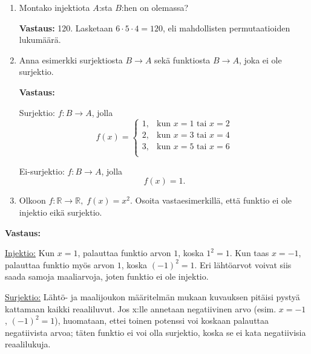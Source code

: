 \documentclass[a4paper,12pt]{article}
\begin{document}
\begin{enumerate}
\begin{enumerate}
\textbf{Vastaus:} 

Injektio: $f: A \rightarrow B$, jolla
\begin{equation*}
    f(x)=2x.
\end{equation*}

Ei-injektio: $f: A \rightarrow B$, jolla
\begin{equation*}
    f(x)=1.
\end{equation*}

\item Montako injektiota $A$:sta $B$:hen on olemassa?

\textbf{Vastaus:} 120. Lasketaan $6\cdot 5 \cdot 4 = 120$, eli mahdollisten permutaatioiden lukumäärä. 

\item Anna esimerkki surjektiosta $B \to A$ sekä funktiosta $B \to A$, joka ei ole surjektio.

\textbf{Vastaus:} 

Surjektio: $f: B \rightarrow A$, jolla
\begin{equation*}
f(x)=
\begin{cases}
    1, & \text{kun } x = 1 \text{ tai } x = 2 \\
    2, & \text{kun } x = 3 \text{ tai } x = 4 \\
    3, & \text{kun } x = 5 \text{ tai } x = 6 \\
\end{cases}
\end{equation*}

Ei-surjektio:  $f: B \rightarrow A$, jolla
\begin{equation*}
    f(x)=1.
\end{equation*}

\item Olkoon $f:\mathbb{R} \to \mathbb{R}, \; f(x)=x^2$. Osoita vastaesimerkillä, että funktio ei ole injektio eikä surjektio. \\
\end{enumerate}

\textbf{Vastaus:} 

\underline{Injektio:} Kun $x=1$, palauttaa funktio arvon $1$, koska $1^2=1$. Kun taas $x=-1$, palauttaa funktio myös arvon $1$, koska $(-1)^2=1$. Eri lähtöarvot voivat siis saada samoja maaliarvoja, joten funktio ei ole injektio.  

\underline{Surjektio:} Lähtö- ja maalijoukon määritelmän mukaan kuvauksen pitäisi pystyä kattamaan kaikki reaaliluvut. Jos x:lle annetaan negatiivinen arvo (esim. $x=-1$ , $(-1)^2 = 1$), huomataan, ettei toinen potenssi voi koskaan palauttaa negatiivista arvoa; täten funktio ei voi olla surjektio, koska se ei kata negatiivisia reaalilukuja. 




\end{enumerate}
\end{document}
